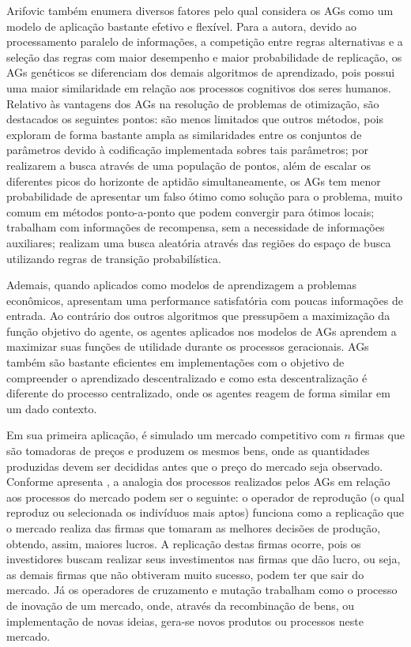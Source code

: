 Arifovic também enumera diversos fatores pelo qual considera os AGs como um modelo de aplicação bastante efetivo e flexível. Para a autora, devido ao processamento paralelo de informações, a competição entre regras alternativas e a seleção das regras com maior desempenho e maior probabilidade de replicação, os AGs genéticos se diferenciam dos demais algoritmos de aprendizado, pois possui uma maior similaridade em relação aos processos cognitivos dos seres humanos. Relativo às vantagens dos AGs na resolução de problemas de otimização, são destacados os seguintes pontos: são menos limitados que outros métodos, pois exploram de forma bastante ampla as similaridades entre os conjuntos de parâmetros devido à codificação implementada sobres tais parâmetros; por realizarem a busca através de uma população de pontos, além de escalar os diferentes picos do horizonte de aptidão simultaneamente, os AGs tem menor probabilidade de apresentar um falso ótimo como solução para o problema, muito comum em métodos ponto-a-ponto que podem convergir para ótimos locais; trabalham com informações de recompensa, sem a necessidade de informações auxiliares; realizam uma busca aleatória através das regiões do espaço de busca utilizando regras de transição probabilística.

Ademais, quando aplicados como modelos de aprendizagem a problemas econômicos, apresentam uma performance satisfatória com poucas informações de entrada. Ao contrário dos outros algoritmos que pressupõem a maximização da função objetivo do agente, os agentes aplicados nos modelos de AGs aprendem a maximizar suas funções de utilidade durante os processos geracionais. AGs também são bastante eficientes em implementações com o objetivo de compreender o aprendizado descentralizado e como esta descentralização é diferente do processo centralizado, onde os agentes reagem de forma similar em um dado contexto.

Em sua primeira aplicação, é simulado um mercado competitivo com $n$ firmas que são tomadoras de preços e produzem os mesmos bens, onde as quantidades produzidas devem ser decididas antes que o preço do mercado seja observado. Conforme apresenta , a analogia dos processos realizados pelos AGs em relação aos processos do mercado podem ser o seguinte: o operador de reprodução (o qual reproduz ou selecionada os indivíduos mais aptos) funciona como a replicação que o mercado realiza das firmas que tomaram as melhores decisões de produção, obtendo, assim, maiores lucros. A replicação destas firmas ocorre, pois os investidores buscam realizar seus investimentos nas firmas que dão lucro, ou seja, as demais firmas que não obtiveram muito sucesso, podem ter que sair do mercado. Já os operadores de cruzamento e mutação trabalham como o processo de inovação de um mercado, onde, através da recombinação de bens, ou implementação de novas ideias, gera-se novos produtos ou processos neste mercado.

